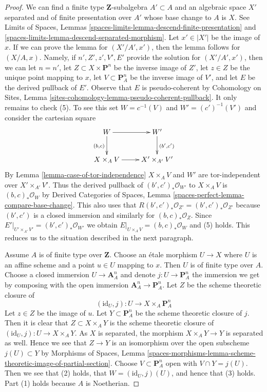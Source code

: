 \documentclass[10pt,a4paper]{amsart}
\theoremstyle{plain}
\theoremstyle{definition}
\theoremstyle{remark}
\numberwithin{equation}{subsection}
\begin{document}
\begin{proof}
We can find a finite type $\mathbf{Z}$-subalgebra $A' \subset A$
and an algebraic space $X'$ separated and of finite presentation over $A'$
whose base change to $A$ is $X$. See
Limits of Spaces, Lemmas
\ref{spaces-limits-lemma-descend-finite-presentation} and
\ref{spaces-limits-lemma-descend-separated-morphism}.
Let $x' \in |X'|$ be the image of $x$.
If we can prove the lemma for $(X'/A', x')$, then
the lemma follows for $(X/A, x)$.
Namely, if $n', Z', z', V', E'$ provide the solution
for $(X'/A', x')$, then we can let
$n = n'$,
let $Z \subset X \times \mathbf{P}^n$ be the inverse image of $Z'$,
let $z \in Z$ be the unique point mapping to $x$,
let $V \subset \mathbf{P}^n_A$ be the inverse image of $V'$, and
let $E$ be the derived pullback of $E'$.
Observe that $E$ is pseudo-coherent by
Cohomology on Sites, Lemma
\ref{sites-cohomology-lemma-pseudo-coherent-pullback}.
It only remains to check (5). To see this
set $W = c^{-1}(V)$ and $W' = (c')^{-1}(V')$
and consider the cartesian square
$$
\xymatrix{
W \ar[d]_{(b, c)} \ar[r] & W' \ar[d]^{(b', c')} \\
X \times_A V \ar[r] & X' \times_{A'} V'
}
$$
By Lemma \ref{lemma-case-of-tor-independence} $X \times_A V$ and $W'$
are tor-independent over $X' \times_{A'} V'$.
Thus the derived pullback of
$(b', c')_*\mathcal{O}_{W'}$ to $X \times_A V$
is $(b, c)_*\mathcal{O}_W$ by
Derived Categories of Spaces,
Lemma \ref{spaces-perfect-lemma-compare-base-change}.
This also uses that $R(b', c')_*\mathcal{O}_{Z'} = (b', c')_*\mathcal{O}_{Z'}$
because $(b', c')$ is a closed immersion and similarly for
$(b, c)_*\mathcal{O}_Z$.
Since $E'|_{U' \times_{A'} V'} =
(b', c')_*\mathcal{O}_{W'}$ we obtain
$E|_{U \times_A V} = (b, c)_*\mathcal{O}_W$
and (5) holds.
This reduces us to the situation described in the next
paragraph.

\medskip\noindent
Assume $A$ is of finite type over $\mathbf{Z}$.
Choose an \'etale morphism $U \to X$ where $U$ is an affine scheme
and a point $u \in U$ mapping to $x$. Then $U$ is of finite type over $A$.
Choose a closed immersion $U \to \mathbf{A}^n_A$ and denote
$j : U \to \mathbf{P}^n_A$ the immersion we get by composing
with the open immersion $\mathbf{A}^n_A \to \mathbf{P}^n_A$.
Let $Z$ be the scheme theoretic closure of
$$
(\text{id}_U, j) : U \longrightarrow X \times_A \mathbf{P}^n_A
$$
Let $z \in Z$ be the image of $u$.
Let $Y \subset \mathbf{P}^n_A$ be the scheme theoretic
closure of $j$. Then it is clear that $Z \subset X \times_A Y$
is the scheme theoretic closure of
$(\text{id}_U, j) : U \to X \times_A Y$.
As $X$ is separated, the morphism
$X \times_A Y \to Y$ is separated as well.
Hence we see that $Z \to Y$ is an isomorphism over
the open subscheme $j(U) \subset Y$ by
Morphisms of Spaces, Lemma
\ref{spaces-morphisms-lemma-scheme-theoretic-image-of-partial-section}.
Choose $V \subset \mathbf{P}^n_A$ open with $V \cap Y = j(U)$.
Then we see that (2) holds, that $W = (\text{id}_U, j)(U)$, and hence
that (3) holds. Part (1) holds because $A$ is Noetherian.


\end{proof}
\end{document}
